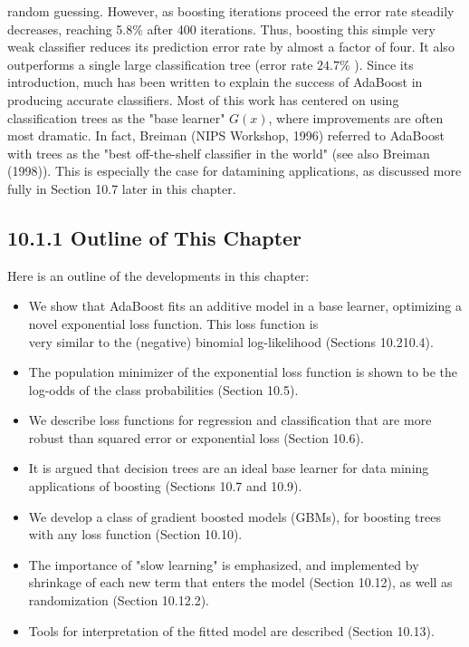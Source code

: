\documentclass[10pt]{article}
\begin{document}
random guessing. However, as boosting iterations proceed the error rate steadily decreases, reaching 5.8\% after 400 iterations. Thus, boosting this simple very weak classifier reduces its prediction error rate by almost a factor of four. It also outperforms a single large classification tree (error rate $24.7 \%$ ). Since its introduction, much has been written to explain the success of AdaBoost in producing accurate classifiers. Most of this work has centered on using classification trees as the "base learner" $G(x)$, where improvements are often most dramatic. In fact, Breiman (NIPS Workshop, 1996) referred to AdaBoost with trees as the "best off-the-shelf classifier in the world" (see also Breiman (1998)). This is especially the case for datamining applications, as discussed more fully in Section 10.7 later in this chapter.

\subsection*{10.1.1 Outline of This Chapter}
Here is an outline of the developments in this chapter:

\begin{itemize}
  \item We show that AdaBoost fits an additive model in a base learner, optimizing a novel exponential loss function. This loss function is\\
very similar to the (negative) binomial log-likelihood (Sections 10.210.4).
  \item The population minimizer of the exponential loss function is shown to be the log-odds of the class probabilities (Section 10.5).
  \item We describe loss functions for regression and classification that are more robust than squared error or exponential loss (Section 10.6).
  \item It is argued that decision trees are an ideal base learner for data mining applications of boosting (Sections 10.7 and 10.9).
  \item We develop a class of gradient boosted models (GBMs), for boosting trees with any loss function (Section 10.10).
  \item The importance of "slow learning" is emphasized, and implemented by shrinkage of each new term that enters the model (Section 10.12), as well as randomization (Section 10.12.2).
  \item Tools for interpretation of the fitted model are described (Section 10.13).
\end{itemize}
\end{document}
